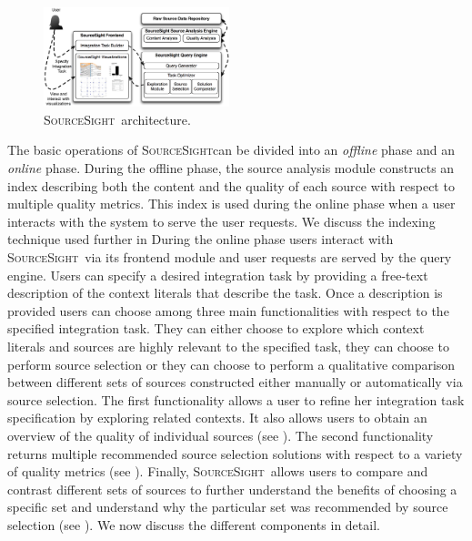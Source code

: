 \documentclass{vldb}
\newcommand\system{\textsc{SourceSight}}
\begin{document}
\begin{figure}[h]
    \centering
    \includegraphics[width=0.48\textwidth]{fig/srcsightOver}
    \caption{\system~architecture.}
    \label{fig:architecture}
\end{figure}

The basic operations of \system can be divided into an {\em offline} phase and an {\em online} phase. During the offline phase, the source analysis module constructs an index describing both the content and the quality of each source with respect to multiple quality metrics. This index is used during the online phase when a user interacts with the system to serve the user requests. We discuss the indexing technique used further in  During the online phase users interact with \system~via its frontend module and user requests are served by the query engine. Users can specify a desired integration task by providing a free-text description of the context literals that describe the task. Once a description is provided users can choose among three main functionalities with respect to the specified integration task. They can either choose to explore which context literals and sources are highly relevant to the specified task, they can choose to perform source selection or they can choose to perform a qualitative comparison between different sets of sources constructed either manually or automatically via source selection. The first functionality allows a user to refine her integration task specification by exploring related contexts. It also allows users to obtain an overview of the quality of individual sources (see ). The second functionality returns multiple recommended source selection solutions with respect to a variety of quality metrics (see ). Finally, \system~allows users to compare and contrast different sets of sources to further understand the benefits of choosing a specific set and understand why the particular set was recommended by source selection (see ). We now discuss the different components in detail.
\end{document}
